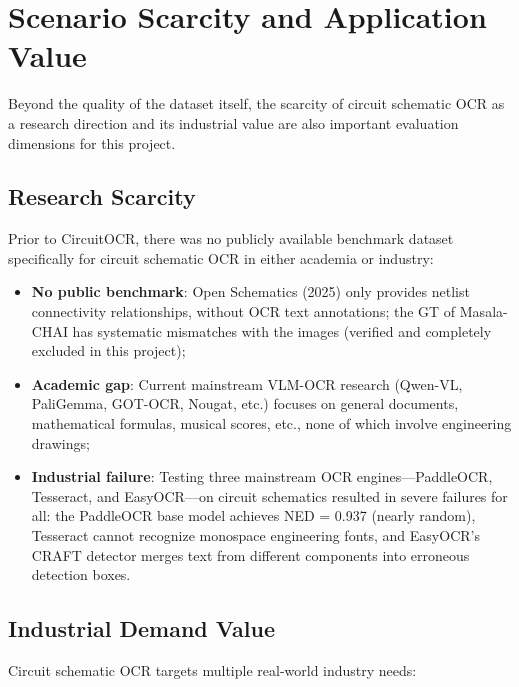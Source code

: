 \section{Scenario Scarcity and Application Value}

Beyond the quality of the dataset itself, the scarcity of circuit schematic OCR as a research direction and its industrial value are also important evaluation dimensions for this project.

\subsection{Research Scarcity}

Prior to CircuitOCR, there was no publicly available benchmark dataset specifically for circuit schematic OCR in either academia or industry:

\begin{itemize}[nosep]
    \item \textbf{No public benchmark}: Open Schematics (2025) only provides netlist connectivity relationships, without OCR text annotations; the GT of Masala-CHAI has systematic mismatches with the images (verified and completely excluded in this project);
    \item \textbf{Academic gap}: Current mainstream VLM-OCR research (Qwen-VL, PaliGemma, GOT-OCR, Nougat, etc.) focuses on general documents, mathematical formulas, musical scores, etc., none of which involve engineering drawings;
    \item \textbf{Industrial failure}: Testing three mainstream OCR engines---PaddleOCR, Tesseract, and EasyOCR---on circuit schematics resulted in severe failures for all: the PaddleOCR base model achieves NED = 0.937 (nearly random), Tesseract cannot recognize monospace engineering fonts, and EasyOCR's CRAFT detector merges text from different components into erroneous detection boxes.
\end{itemize}

\subsection{Industrial Demand Value}

Circuit schematic OCR targets multiple real-world industry needs:

